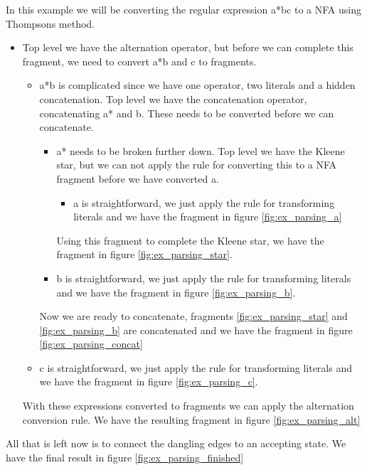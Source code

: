 \begin{example}
In this example we will be converting the regular expression
\textsf{a*b\textbar c} to a NFA using Thompsons method.
\begin{itemize}
\item Top level we have the alternation operator, but before we can
  complete this fragment, we need to convert \textsf{a*b} and
  \textsf{c} to fragments.
  \begin{itemize}
  \item \textsf{a*b} is complicated since we have one operator, two
    literals and a hidden concatenation. Top level we have the
    concatenation operator, concatenating \textsf{a*} and
    \textsf{b}. These needs to be converted before we can concatenate.
    \begin{itemize}
    \item \textsf{a*} needs to be broken further down. Top level we have
      the Kleene star, but we can not apply the rule for converting this
      to a NFA fragment before we have converted \textsf{a}. 
      \begin{itemize}
        \item \textsf{a} is straightforward, we just apply the rule
          for transforming literals and we have the fragment in figure
          \ref{fig:ex_parsing_a}
      \end{itemize}
      Using this fragment to complete the Kleene star, we have the
      fragment in figure \ref{fig:ex_parsing_star}.
    \item \textsf{b} is straightforward, we just apply the rule for
      transforming literals and we have the fragment in figure
      \ref{fig:ex_parsing_b}.
    \end{itemize}
    Now we are ready to concatenate, fragments
    \ref{fig:ex_parsing_star} and \ref{fig:ex_parsing_b} are
    concatenated and we have the fragment in figure \ref{fig:ex_parsing_concat}
  \item \textsf{c} is straightforward, we just apply the rule for
    transforming literals and we have the fragment in figure
    \ref{fig:ex_parsing_c}.
  \end{itemize}
  With these expressions converted to fragments we can apply the
  alternation conversion rule. We have the resulting fragment in
  figure \ref{fig:ex_parsing_alt}
\end{itemize}

All that is left now is to connect the dangling edges to an accepting
state. We have the final result in figure \vref{fig:ex_parsing_finished}
  
\end{example}

